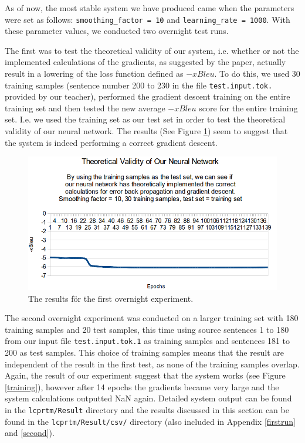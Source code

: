 \documentclass[a4paper]{article}
\begin{document}
As of now, the most stable system we have produced came when the parameters were set as follows: \verb|smoothing_factor = 10| and \verb|learning_rate = 1000|. With these parameter values, we conducted two overnight test runs. 

The first was to test the theoretical validity of our system, i.e. whether or not the implemented calculations of the gradients, as suggested by the paper, actually result in a lowering of the loss function defined as $-xBleu$. To do this, we used 30 training samples (sentence number 200 to 230 in the file \verb|test.input.tok.| provided by our teacher), performed the gradient descent training on the entire training set and then tested the new average $-xBleu$ score for the entire training set. I.e. we used the training set as our test set in order to test the theoretical validity of our neural network. The results (See Figure \ref{results}) seem to suggest that the system is indeed performing a correct gradient descent.

\begin{figure}
\label{results}
\caption{The results för the first overnight experiment.}
\centering
\includegraphics[width=\linewidth]{Theoretical_validity_graph}
\end{figure}

The second overnight experiment was conducted on a larger training set with 180 training samples and 20 test samples, this time using source sentences 1 to 180 from our input file \verb|test.input.tok.1| as training samples and sentences 181 to 200 as test samples. This choice of training samples means that the result are independent of the result in the first test, as none of the training samples overlap. Again, the result of our experiment suggest that the system works (see Figure \ref{training}), however after 14 epochs the gradients became very large and the system calculations outputted NaN again. Detailed system output can be found in the \verb|lcprtm/Result| directory and the results discussed in this section can be found in the \verb|lcprtm/Result/csv/| directory (also included in Appendix \ref{firstrun} and \ref{second}).
\end{document}
